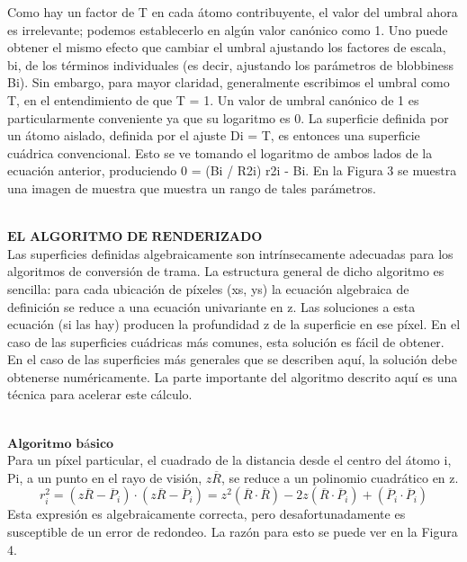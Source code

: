 Como hay un factor de T en cada átomo contribuyente, el valor del umbral ahora es irrelevante; podemos establecerlo en algún valor canónico como 1. Uno puede obtener el mismo efecto que cambiar el umbral ajustando los factores de escala, bi, de los términos individuales (es decir, ajustando los parámetros de blobbiness Bi). Sin embargo, para mayor claridad, generalmente escribimos el umbral como T, en el entendimiento de que T = 1. Un valor de umbral canónico de 1 es particularmente conveniente ya que su logaritmo es 0. La superficie definida por un átomo aislado, definida por el ajuste Di = T, es entonces una superficie cuádrica convencional. Esto se ve tomando el logaritmo de ambos lados de la ecuación anterior, produciendo 0 = (Bi / R2i) r2i - Bi. En la Figura 3 se muestra una imagen de muestra que muestra un rango de tales parámetros.

${ }$\\
$\textbf{EL ALGORITMO DE RENDERIZADO}$
${ }$\\

Las superficies definidas algebraicamente son intrínsecamente adecuadas para los algoritmos de conversión de trama. La estructura general de dicho algoritmo es sencilla: para cada ubicación de píxeles (xs, ys) la ecuación algebraica de definición se reduce a una ecuación univariante en z. Las soluciones a esta ecuación (si las hay) producen la profundidad z de la superficie en ese píxel. En el caso de las superficies cuádricas más comunes, esta solución es fácil de obtener. En el caso de las superficies más generales que se describen aquí, la solución debe obtenerse numéricamente. La parte importante del algoritmo descrito aquí es una técnica para acelerar este cálculo.

${ }$\\
$\textbf{Algoritmo básico}$
${ }$\\

Para un píxel particular, el cuadrado de la distancia desde el centro del átomo i, Pi, a un punto en el rayo de visión, $z \overline{R}$, se reduce a un polinomio cuadrático en z.
\[
	r^{2}_{i} = (z\overline{R} - \overline{P}_i)\cdot(z\overline{R} - \overline{P}_i) = z^2(\overline{R} \cdot \overline{R}) - 2 z (\overline{R} \cdot \overline{P}_i) + (\overline{P}_i \cdot \overline{P}_i)
\]
Esta expresión es algebraicamente correcta, pero desafortunadamente es susceptible de un error de redondeo. La razón para esto se puede ver en la Figura 4.

